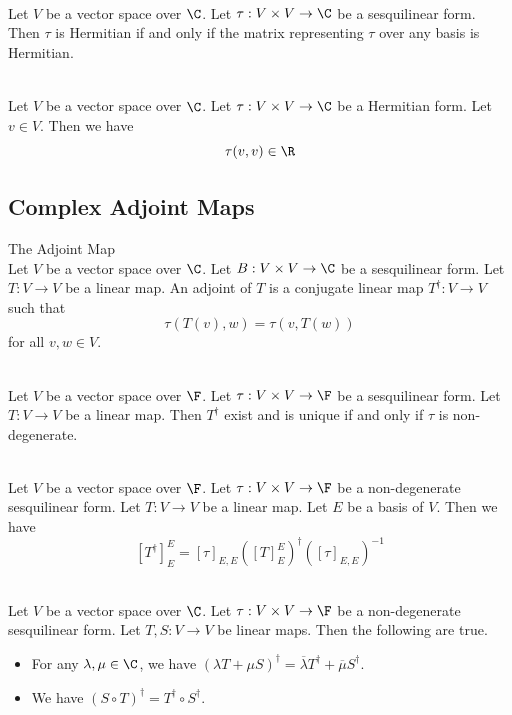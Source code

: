\documentclass[a4paper]{article}
\begin{document}
\begin{prp}{}{}\\
Let $V$ be a vector space over $\C$. Let $\tau:V\times V\to\C$ be a sesquilinear form. Then $\tau$ is Hermitian if and only if the matrix representing $\tau$ over any basis is Hermitian. 
\end{prp}

\begin{lmm}{}{}\\
Let $V$ be a vector space over $\C$. Let $\tau:V\times V\to\C$ be a Hermitian form. Let $v\in V$. Then we have $$\tau(v,v)\in\R$$
\end{lmm}

\subsection{Complex Adjoint Maps}
\begin{defn}{The Adjoint Map}{}\\
Let $V$ be a vector space over $\C$. Let $B:V\times V\to\C$ be a sesquilinear form. Let $T:V\to V$ be a linear map. An adjoint of $T$ is a conjugate linear map $T^\dagger:V\to V$ such that $$\tau(T(v),w)=\tau(v,T(w))$$ for all $v,w\in V$. 
\end{defn}

\begin{lmm}{}{}\\
Let $V$ be a vector space over $\F$. Let $\tau:V\times V\to\F$ be a sesquilinear form. Let $T:V\to V$ be a linear map. Then $T^\dagger$ exist and is unique if and only if $\tau$ is non-degenerate. 
\end{lmm}

\begin{prp}{}{}\\
Let $V$ be a vector space over $\F$. Let $\tau:V\times V\to\F$ be a non-degenerate sesquilinear form. Let $T:V\to V$ be a linear map. Let $E$ be a basis of $V$. Then we have $$[T^\dagger]_E^E=[\tau]_{E,E}([T]_E^E)^\dagger([\tau]_{E,E})^{-1}$$
\end{prp}

\begin{prp}{}{}\\
Let $V$ be a vector space over $\C$. Let $\tau:V\times V\to\F$ be a non-degenerate sesquilinear form. Let $T,S:V\to V$ be linear maps. Then the following are true. 
\begin{itemize}
\item For any $\lambda,\mu\in\C$, we have $(\lambda T+\mu S)^\dagger=\overline{\lambda}T^\dagger+\overline{\mu}S^\dagger$. 
\item We have $(S\circ T)^\dagger=T^\dagger\circ S^\dagger$. 
\end{itemize}
\end{prp}
\end{document}
